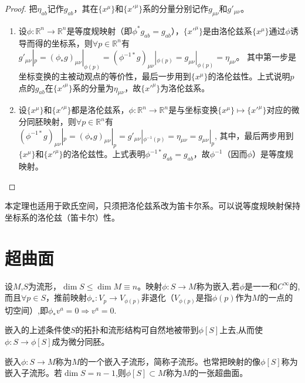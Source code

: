 \begin{proof}
	把$\eta_{ab}$记作$g_{ab}$，其在$\{x^\mu\}$和$\{x'^\mu\}$系的分量分别记作$g_{\mu\nu}$和$g'_{\mu\nu}$。
	\begin{enumerate}[（A）]
		\item 设$\phi \colon \mathbb{R}^n \to \mathbb{R}^n$是等度规映射（即$\phi^*g_{ab} = g_{ab}$），$\{x'^\mu\}$是由洛伦兹系$\{x^\mu\}$通过$\phi$诱导而得的坐标系，则$\forall p \in \mathbb{R}^n$有
		      $g'_{\mu\nu}|_p = (\phi_*g)_{\mu\nu}|_{\phi(p)} = (\phi^{-1*}g)_{\mu\nu}|_{\phi(p)} = g_{\mu\nu}|_{\phi(p)} = \eta_{\mu\nu}$。
		      其中第一步是坐标变换的主被动观点的等价性，最后一步用到$\{x^\mu\}$的洛伦兹性。上式说明$p$点的$g_{ab}$在$\{x'^\mu\}$系的分量为$\eta_{\mu\nu}$，故$\{x'^\mu\}$为洛伦兹系。
		\item 设$\{x^\mu\}$和$\{x'^\mu\}$都是洛伦兹系，$\phi \colon \mathbb{R}^n \to \mathbb{R}^n$是与坐标变换$\{x^\mu\} \mapsto \{x'^\mu\}$对应的微分同胚映射，则$\forall p \in \mathbb{R}^n$有
		      $(\phi^{-1*}g)_{\mu\nu}|_p = (\phi_*g)_{\mu\nu}|_p = g'_{\mu\nu}|_{\phi^{-1}(p)} = \eta_{\mu\nu} = g_{\mu\nu}|_p$,
		      其中，最后两步用到$\{x^\mu\}$和$\{x'^\mu\}$的洛伦兹性。上式表明$\phi^{-1*}g_{ab} = g_{ab}$，故$\phi^{-1}$（因而$\phi$）是等度规映射。
	\end{enumerate}
\end{proof}

\begin{note}
	本定理也适用于欧氏空间，只须把洛伦兹系改为笛卡尔系。可以说等度规映射保持坐标系的洛伦兹（笛卡尔）性。
\end{note}

\section{超曲面}

\begin{definition}
	设$M$,$S$为流形，$\dim S \le \dim M \equiv n$。映射$\phi \colon S \to M$称为嵌入,若$\phi$是一一和$C^\infty$的,而且$\forall p \in S$，推前映射$\phi_* \colon V_p \to V_{\phi(p)}$非退化（$V_{\phi(p)}$是指$\phi(p)$作为$M$的一点的切空间）,即$\phi_*v^a = 0 \Rightarrow v^a = 0$.
\end{definition}

\begin{note}
	嵌入的上述条件使$S$的拓扑和流形结构可自然地被带到$\phi[S]$上去,从而使$\phi \colon S \to \phi[S]$成为微分同胚。
\end{note}

\begin{definition}
	嵌入$\phi \colon S \to M$称为$M$的一个嵌入子流形，简称子流形。也常把映射的像$\phi[S]$称为嵌入子流形。若$\dim S = n - 1$,则$\phi[S] \subset M$称为$M$的一张超曲面。
\end{definition}



